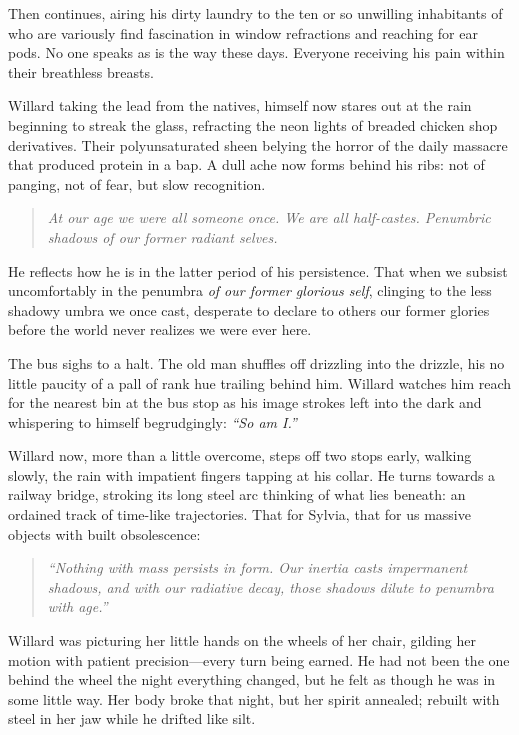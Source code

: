 Then continues, airing his dirty laundry to the ten or so unwilling inhabitants of who are variously find fascination in window refractions and reaching for ear pods. No one speaks as is the way these days. Everyone receiving his pain within their breathless breasts.

Willard taking the lead from the natives, himself now stares out at the rain beginning to streak the glass, refracting the neon lights of breaded chicken shop derivatives. Their polyunsaturated sheen belying the horror of the daily massacre that produced protein in a bap. A dull ache now forms behind his ribs: not of panging, not of fear, but slow recognition.

\begin{quote}
\emph{At our age we were all someone once. We are all half-castes. Penumbric shadows of our former radiant selves.}
\end{quote}

He reflects how he is in the latter period of his persistence. That when we subsist uncomfortably in the penumbra \emph{of our former glorious self}, clinging to the less shadowy umbra we once cast, desperate to declare to others our former glories before the world never realizes we were ever here.

The bus sighs to a halt. The old man shuffles off drizzling into the drizzle, his no little paucity of a pall of rank hue trailing behind him. Willard watches him reach for the nearest bin at the bus stop as his image strokes left into the dark and whispering to himself begrudgingly: \emph{``So am I.''}

Willard now, more than a little overcome, steps off two stops early, walking slowly, the rain with impatient fingers tapping at his collar. He turns towards a railway bridge, stroking its long steel arc thinking of what lies beneath: an ordained track of time-like trajectories. That for Sylvia, that for us  massive objects with built obsolescence:
\begin{quote}
\emph{``Nothing with mass persists in form. Our inertia casts impermanent shadows, and with our radiative decay, those shadows dilute to penumbra with age.''}
\end{quote}

Willard was picturing her little hands on the wheels of her chair, gilding her motion with patient precision—every turn being earned. He had not been the one behind the wheel the night everything changed, but he felt as though he was in some little way. Her body broke that night, but her spirit annealed; rebuilt with steel in her jaw while he drifted like silt.

